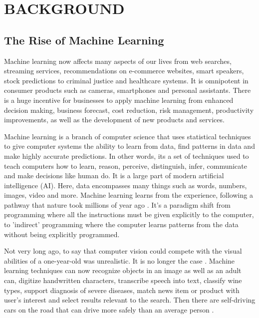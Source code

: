 
\chapter{BACKGROUND}

\graphicspath{ {./background/} }
\thispagestyle{empty}


\section{The Rise of Machine Learning}

Machine learning now affects many aspects of our lives from web searches, streaming services, recommendations on e-commerce websites, smart speakers, stock predictions to criminal justice and healthcare systems. It is omnipotent in consumer products such as cameras, smartphones and personal assistants. There is a huge incentive for businesses to apply machine learning from enhanced decision making, business forecast, cost reduction, risk management, productivity improvements, as well as the development of new products and services.

Machine learning is a branch of computer science that uses statistical techniques to give computer systems the ability to learn from data, find patterns in data and make highly accurate predictions. In other words, its a set of techniques used to teach computers how to learn, reason, perceive, distinguish, infer, communicate and make decisions like human do. It is a large part of modern artificial intelligence (AI). Here, data encompasses many things such as words, numbers, images, video and more. Machine learning learns from the experience, following a pathway that nature took millions of year ago \cite{sejnowski2018deep}. It's a paradigm shift from programming where all the instructions must be given explicitly to the computer, to 'indirect' programming where the computer learns patterns from the data without being explicitly programmed.

Not very long ago, to say that computer vision could compete with the visual abilities of a one-year-old was unrealistic. It is no longer the case \cite{sejnowski2018deep}. Machine learning techniques can now recognize objects in an image as well as an adult can, digitize handwritten characters, transcribe speech into text, classify wine types, support diagnosis of severe diseases, match news item or product with user's interest and select results relevant to the search. Then there are self-driving cars on the road that can drive more safely than an average person \cite{sejnowski2018deep}.

